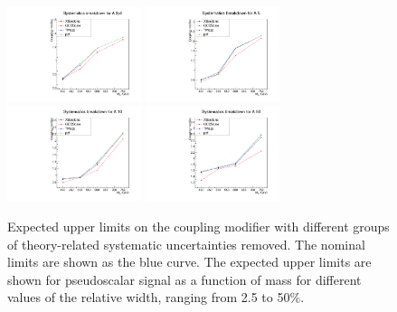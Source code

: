 \begin{figure}[!Hhtb]
\centering
\includegraphics[width=0.35\textwidth,keepaspectratio=true]{fig/app5/breakdowns/theory_breakdown_A_2p5.pdf}
\includegraphics[width=0.35\textwidth,keepaspectratio=true]{fig/app5/breakdowns/theory_breakdown_A_5.pdf}
\includegraphics[width=0.35\textwidth,keepaspectratio=true]{fig/app5/breakdowns/theory_breakdown_A_10.pdf}
\includegraphics[width=0.35\textwidth,keepaspectratio=true]{fig/app5/breakdowns/theory_breakdown_A_50.pdf}
\caption{Expected upper limits on the coupling modifier with different groups of theory-related systematic uncertainties removed. The nominal limits are shown as the blue curve. The expected upper limits are shown for pseudoscalar signal as a function of mass for different values of the relative width, ranging from 2.5 to 50\%.}
\label{fig:theory_breakdown_awidths}
\end{figure}

